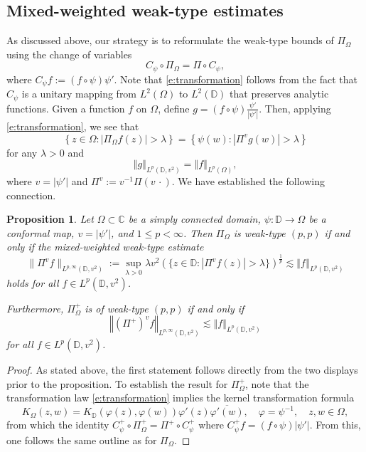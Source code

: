 \documentclass{amsart}
\newcommand{\abs}[1]{\left\vert {#1}\right\vert}
\newcommand{\norm}[1]{\left\Vert {#1}\right\Vert}
\newtheorem{proposition}[theorem]{Proposition}
\theoremstyle{definition}
\numberwithin{equation}{section}
\begin{document}
\subsection{Mixed-weighted weak-type estimates}\label{Subsection:MixedWeighted}
As discussed above, our strategy is to reformulate the weak-type bounds of $\Pi_{\Omega}$ using the change of variables  
	\begin{equation}\label{e:transformation} C_\psi \circ \Pi_{\Omega} = \Pi \circ C_\psi, \end{equation}
where $C_\psi f := (f \circ \psi ) \psi'$. Note that \eqref{e:transformation} follows from the fact that $C_\psi$ is a unitary mapping from $L^2(\Omega)$ to $L^2(\mathbb{D})$ that preserves analytic functions. 
Given a function $f$ on $\Omega$, define $g =(f \circ \psi)\frac{\psi'}{|\psi'|}$. Then, applying \eqref{e:transformation}, we see that 
\[
    \left\{ z \in \Omega \colon \abs{\Pi_\Omega f(z)} > \lambda \right\} = \left\{ \psi(w) \colon \abs{ \Pi^vg(w)} > \lambda \right\}
\]
for any $\lambda>0$ and
\[
    \norm{g}_{L^p(\mathbb D,v^2)} = \norm{f}_{L^p(\Omega)},
\]
where $v = |\psi'|$ and $\Pi^v:= v^{-1}\Pi(v\,\cdot)$. We have established the following connection.
\begin{proposition}\label{p:change}
    Let $\Omega \subset \mathbb{C}$ be a simply connected domain, $\psi\colon\mathbb{D}\rightarrow \Omega$ be a conformal map, $v = |\psi'|$, and $1\le p < \infty$. Then $\Pi_\Omega$ is weak-type $(p,p)$ if and only if the mixed-weighted weak-type estimate
\[ 
\|\Pi^vf\|_{L^{p,\infty}(\mathbb{D},v^2)} := \sup_{\lambda>0} \lambda v^2(\{ z \in \mathbb{D} \colon |\Pi^vf(z)| > \lambda \})^{\frac 1p} \lesssim \norm{f}_{L^p(\mathbb D, v^{2})}\]
holds for all $f \in L^p(\mathbb D,v^2)$. 

Furthermore, $\Pi_\Omega^+$ is of weak-type $(p,p)$ if and only if 
    \[ \norm{(\Pi^+)^v f}_{L^{p,\infty}(\mathbb D,v^2)} \lesssim \norm{f}_{L^p(\mathbb D,v^2)}\]
for all $f \in L^p(\mathbb D,v^2)$.
\end{proposition}
\begin{proof}
As stated above, the first statement follows directly from the two displays prior to the proposition. To establish the result for $\Pi_\Omega^+$, note that the transformation law \eqref{e:transformation} implies the kernel transformation formula
    \[ K_\Omega(z,w) = K_{\mathbb D}(\varphi(z),\varphi(w)) \varphi'(z) \overline{\varphi'(w)}, \quad \varphi = \psi^{-1}, \quad z,w \in \Omega,\]
from which the identity $C_\psi^+ \circ \Pi_\Omega^+ = \Pi^+ \circ C_\psi^+$ where $C_\psi^+f = (f \circ \psi) |\psi'|$. From this, one follows the same outline as for $\Pi_\Omega$.
\end{proof}
\end{document}
